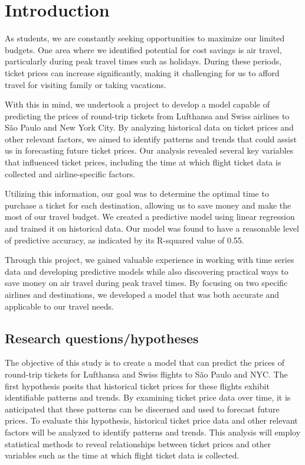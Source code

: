 \section{Introduction}
\label{chap:introduction}

As students, we are constantly seeking opportunities to maximize our limited budgets.
One area where we identified potential for cost savings is air travel, particularly during peak travel times such as holidays.
During these periods, ticket prices can increase significantly, making it challenging for us to afford travel for visiting family or taking vacations.

With this in mind, we undertook a project to develop a model capable of predicting the prices of round-trip tickets from Lufthansa and Swiss airlines to São Paulo and New York City.
By analyzing historical data on ticket prices and other relevant factors, we aimed to identify patterns and trends that could assist us in forecasting future ticket prices.
Our analysis revealed several key variables that influenced ticket prices, including the time at which flight ticket data is collected and airline-specific factors.

Utilizing this information, our goal was to determine the optimal time to purchase a ticket for each destination, allowing us to save money and make the most of our travel budget.
We created a predictive model using linear regression and trained it on historical data.
Our model was found to have a reasonable level of predictive accuracy, as indicated by its R-squared value of 0.55.

Through this project, we gained valuable experience in working with time series data and developing predictive models while also discovering practical ways to save money on air travel during peak travel times.
By focusing on two specific airlines and destinations, we developed a model that was both accurate and applicable to our travel needs.

\subsection{Research questions/hypotheses}
\label{sec:quesstion}

The objective of this study is to create a model that can predict the prices of round-trip tickets for Lufthansa and Swiss flights to São Paulo and NYC. 
The first hypothesis posits that historical ticket prices for these flights exhibit identifiable patterns and trends. 
By examining ticket price data over time, it is anticipated that these patterns can be discerned and used to forecast future prices. 
To evaluate this hypothesis, historical ticket price data and other relevant factors will be analyzed to identify patterns and trends. 
This analysis will employ statistical methods to reveal relationships between ticket prices and other variables such as the time at which flight ticket data is collected.

